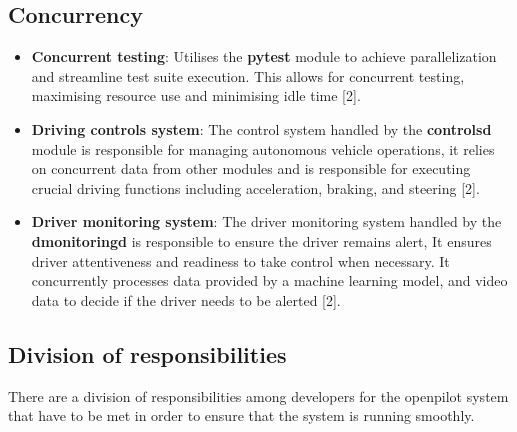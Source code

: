 \documentclass[12pt]{article}
\begin{document}
\subsection{Concurrency}
    \begin{itemize}
        \item[] \textbf{Concurrent testing}: Utilises the \textbf{pytest} module to achieve parallelization and streamline test suite execution. This allows for concurrent testing, maximising resource use and minimising idle time [2]. 
        \item[] \textbf{Driving controls system}: The control system handled by the \textbf{controlsd} module is responsible for managing autonomous vehicle operations, it relies on concurrent data from other modules and is responsible for executing crucial driving functions including acceleration, braking, and steering [2].
        \item[] \textbf{Driver monitoring system}: The driver monitoring system handled by the \textbf{dmonitoringd} is responsible to ensure the driver remains alert, It ensures driver attentiveness and readiness to take control when necessary. It concurrently processes data provided by a machine learning model, and video data to decide if the driver needs to be alerted [2].

    \end{itemize}



\subsection{Division of responsibilities}%

There are a division of responsibilities among developers for the openpilot system that have to be met in order to ensure that the system is running smoothly. 
\end{document}
